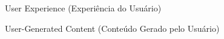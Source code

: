 \begin{siglas}
  \item[UX] User Experience (Experiência do Usuário)
  \item[UCG] User-Generated Content (Conteúdo Gerado pelo Usuário) 
\end{siglas}